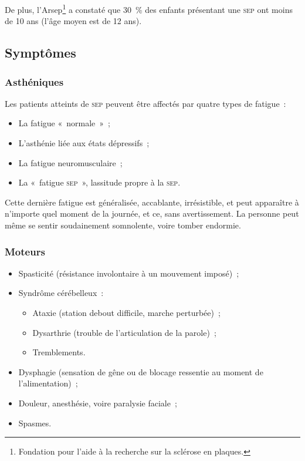 \documentclass[a4paper,12pt,francais]{article}
\newcommand{\SEP}{\textsc{sep}\xspace}
\begin{document}
De plus, l’Arsep\footnote{Fondation pour l'aide à la recherche sur la sclérose en plaques.} a constaté que 30~\% des enfants présentant une \SEP{} ont moins de 10 ans (l’âge moyen est de 12 ans).

\subsection{Symptômes}

\subsubsection{Asthéniques}
Les patients atteints de \SEP{} peuvent être affectés par quatre types de fatigue~:
\begin{itemize}
    \item La fatigue «~normale~»~;
    \item L’asthénie liée aux états dépressifs~;
    \item La fatigue neuromusculaire~;
    \item La «~fatigue \SEP{}~», lassitude propre à la \SEP{}.
\end{itemize}

Cette dernière fatigue est généralisée, accablante, irrésistible, et peut apparaître à n’importe quel moment de la journée, et ce, sans avertissement. La personne peut même se sentir soudainement somnolente, voire tomber endormie.

\subsubsection{Moteurs}
\begin{itemize}
    \item Spasticité (résistance involontaire à un mouvement imposé)~;
    \item Syndrôme cérébelleux~:
        \begin{itemize}
            \item Ataxie (station debout difficile, marche perturbée)~;
            \item Dysarthrie (trouble de l’articulation de la parole)~;
            \item Tremblements.
        \end{itemize}
    \item Dysphagie (sensation de gêne ou de blocage ressentie au moment de l’alimentation)~;
    \item Douleur, anesthésie, voire paralysie faciale~;
    \item Spasmes.
\end{itemize}
\end{document}

